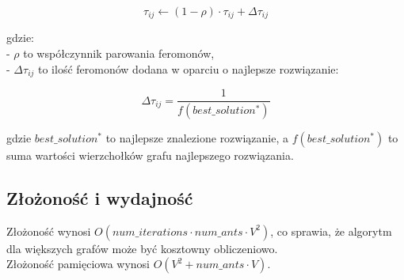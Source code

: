 \[
\tau_{ij} \leftarrow (1 - \rho) \cdot \tau_{ij} + \Delta \tau_{ij}
\]

gdzie:\\
- \( \rho \) to współczynnik parowania feromonów,\\
- \( \Delta \tau_{ij} \) to ilość feromonów dodana w oparciu o najlepsze rozwiązanie:

\[
\Delta \tau_{ij} = \frac{1}{f(best\_solution^*)}
\]

gdzie \( best\_solution^* \) to najlepsze znalezione rozwiązanie, a \( f(best\_solution^*) \) to suma wartości wierzchołków grafu najlepszego rozwiązania.

\subsection{Złożoność i wydajność}

Złożoność wynosi $O(num\_iterations \cdot num\_ants \cdot V^2)$, co sprawia, że algorytm dla większych grafów może być kosztowny obliczeniowo.\\
Złożoność pamięciowa wynosi $O(V^2+num\_ants \cdot V)$.

